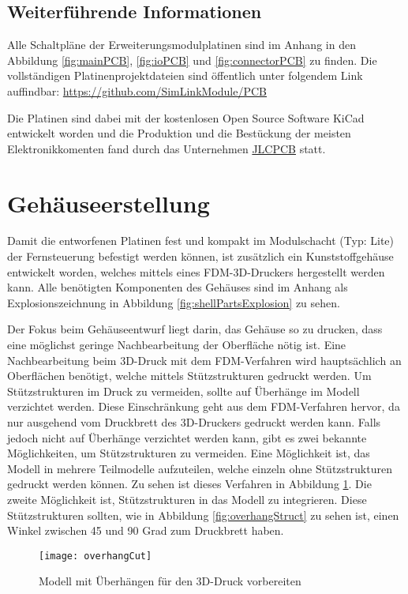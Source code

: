 \subsection{Weiterführende Informationen}

Alle Schaltpläne der Erweiterungsmodulplatinen sind im Anhang in den Abbildung \ref{fig:mainPCB}, \ref{fig:ioPCB} und  \ref{fig:connectorPCB} zu finden. Die vollständigen Platinenprojektdateien sind öffentlich unter folgendem Link auffindbar: \url{https://github.com/SimLinkModule/PCB}

Die Platinen sind dabei mit der kostenlosen Open Source Software KiCad \cite{aboutkicad} entwickelt worden und die Produktion und die Bestückung der meisten Elektronikkomenten fand durch das Unternehmen \href{https://jlcpcb.com/}{JLCPCB} statt.

\section{Gehäuseerstellung}
\label{section:caseImplementation}
Damit die entworfenen Platinen fest und kompakt im Modulschacht (Typ: Lite) der Fernsteuerung befestigt werden können, ist zusätzlich ein Kunststoffgehäuse entwickelt worden, welches mittels eines \ac{FDM}-3D-Druckers hergestellt werden kann. Alle benötigten Komponenten des Gehäuses sind im Anhang als Explosionszeichnung in Abbildung \ref{fig:shellPartsExplosion} zu sehen.

Der Fokus beim Gehäuseentwurf liegt darin, das Gehäuse so zu drucken, dass eine möglichst geringe Nachbearbeitung der Oberfläche nötig ist. Eine Nachbearbeitung beim 3D-Druck mit dem \ac{FDM}-Verfahren wird hauptsächlich an Oberflächen benötigt, welche mittels Stützstrukturen gedruckt werden. Um Stützstrukturen im Druck zu vermeiden, sollte auf Überhänge im Modell verzichtet werden. Diese Einschränkung geht aus dem \ac{FDM}-Verfahren hervor, da nur ausgehend vom Druckbrett des 3D-Druckers gedruckt werden kann. Falls jedoch nicht auf Überhänge verzichtet werden kann, gibt es zwei bekannte Möglichkeiten, um Stützstrukturen zu vermeiden. Eine Möglichkeit ist, das Modell in mehrere Teilmodelle aufzuteilen, welche einzeln ohne Stützstrukturen gedruckt werden können. Zu sehen ist dieses Verfahren in Abbildung \ref{fig:overhangCut}. Die zweite Möglichkeit ist, Stützstrukturen in das Modell zu integrieren. Diese Stützstrukturen sollten, wie in Abbildung \ref{fig:overhangStruct} zu sehen ist, einen Winkel zwischen 45 und 90 Grad zum Druckbrett haben.

\begin{figure}[h]
    \centering
    \texttt{[image: overhangCut]}
    \caption{Modell mit Überhängen für den 3D-Druck vorbereiten}
    \label{fig:overhangCut}
\end{figure}

